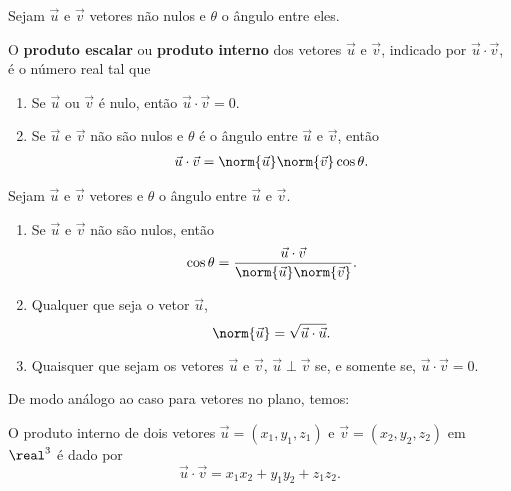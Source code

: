 Sejam $\vec{u}$ e $\vec{v}$ vetores n\~ao nulos e $\theta$ o \^angulo entre eles.
\begin{center}
\end{center}


\begin{definicao}\label{produtointerno-espaco}
  O \textbf{produto escalar} ou \textbf{produto interno} dos vetores $\vec{u}$ e $\vec{v}$, indicado por $\vec{u}\cdot\vec{v}$, \'e o n\'umero real tal que
  \begin{enumerate}
    \item Se $\vec{u}$ ou $\vec{v}$ \'e nulo, ent\~ao $\vec{u}\cdot\vec{v} = 0$.
    \item Se $\vec{u}$ e $\vec{v}$ n\~ao s\~ao nulos e $\theta$ \'e o \^angulo entre $\vec{u}$ e $\vec{v}$, ent\~ao
    \begin{align}\label{produto-interno-espaco}
      \vec{u}\cdot\vec{v} = \norm{\vec{u}}\norm{\vec{v}}\cos\theta.
    \end{align}
  \end{enumerate}
\end{definicao}

\begin{proposicao}
  Sejam $\vec{u}$ e $\vec{v}$ vetores e $\theta$ o \^angulo entre $\vec{u}$ e $\vec{v}$.
  \begin{enumerate}
    \item Se $\vec{u}$ e $\vec{v}$ n\~ao s\~ao nulos, ent\~ao
    \[
      \cos\theta = \dfrac{\vec{u}\cdot\vec{v}}{\norm{\vec{u}}\norm{\vec{v}}}.
    \]
    \item Qualquer que seja o vetor $\vec{u}$,
    \[
      \norm{\vec{u}} = \sqrt{\vec{u}\cdot\vec{u}}.
    \]
    \item Quaisquer que sejam os vetores $\vec{u}$ e $\vec{v}$, $\vec{u}\perp\vec{v}$ se, e somente se, $\vec{u}\cdot\vec{v} = 0$.
    \end{enumerate}
\end{proposicao}
De modo an\'alogo ao caso para vetores no plano, temos:
\begin{teorema}
  O produto interno de dois vetores $\vec{u} = (x_1, y_1,z_1)$ e $\vec{v} = (x_2, y_2,z_2)$ em $\real^3$ \'e dado por
  \[
    \vec{u}\cdot\vec{v} = x_1x_2 + y_1y_2 + z_1z_2.
  \]
\end{teorema}

